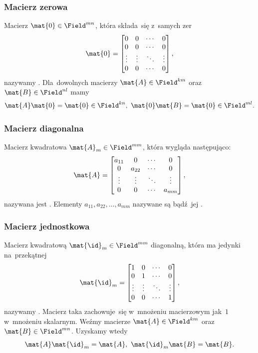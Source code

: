 \subsubsection{Macierz zerowa}
Macierz $\mat{0}\in \Field^{mn}$, która składa~się z~samych zer
$$
	\mat{0}=
	\begin{bmatrix}
		0      & 0      & \cdots & 0      \\
		0      & 0      & \cdots & 0      \\
		\vdots & \vdots & \ddots & \vdots \\
		0      & 0      & \cdots & 0      \\
	\end{bmatrix},
$$
nazywamy .
Dla~dowolnych macierzy $\mat{A}\in \Field^{km}$ oraz~$\mat{B}\in \Field^{nl}$
mamy
$$
	\mat{A}\mat{0} = \mat{0}\in \Field^{kn}, \ \mat{0}\mat{B} = \mat{0}\in \Field^{ml}.
$$

\subsubsection{Macierz diagonalna}
Macierz kwadratowa $\mat{A}_m\in \Field^{mm}$, która wygląda następująco:
$$
	\mat{A} =
	\begin{bmatrix}
		a_{11} & 0      & \cdots & 0      \\
		0      & a_{22} & \cdots & 0      \\
		\vdots & \vdots & \ddots & \vdots \\
		0      & 0      & \cdots & a_{mm}
	\end{bmatrix},
$$
nazywana jest .
Elementy $a_{11}, a_{22}, \ldots, a_{mm}$ nazywane są  bądź~jej
.

\subsubsection{Macierz jednostkowa}
Macierz kwadratową $\mat{\id}_m\in \Field^{mm}$ diagonalną, która ma jedynki na~przekątnej
$$
	\mat{\id}_m=
	\begin{bmatrix}
		1      & 0      & \cdots & 0      \\
		0      & 1      & \cdots & 0      \\
		\vdots & \vdots & \ddots & \vdots \\
		0      & 0      & \cdots & 1      \\
	\end{bmatrix},
$$
nazywamy . Macierz taka zachowuje~się
w~mnożeniu macierzowym jak~$1$ w~mnożeniu skalarnym. Weźmy macierze
$\mat{A}\in \Field^{km}$ oraz
$\mat{B}\in \Field^{mn}$. Uzyskamy wtedy
$$
	\mat{A}\mat{\id}_m = \mat{A}, \ \mat{\id}_m\mat{B} = \mat{B}.
$$

